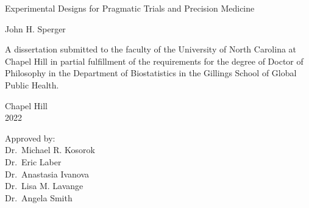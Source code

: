 \documentclass[12pt,,letterpaper,twoside]{report}
\begin{document}

\begin{titlepage}
\begin{center}


\vspace{2in}
\begin{singlespace}
Experimental Designs for Pragmatic Trials and Precision Medicine
\end{singlespace}


\vspace{61pt} %
John H. Sperger
\end{center}

\vspace{50pt}
\begin{singlespace}
\begin{center}
\noindent 
A dissertation submitted to the faculty of the University of North Carolina at Chapel Hill in partial fulfillment of the requirements for the degree of Doctor
of Philosophy in the Department of Biostatistics in the Gillings School
of Global Public Health.
\end{center}
\end{singlespace}


\vspace{50pt}
\begin{center}
\begin{singlespace} 
Chapel Hill\\
2022
\end{singlespace}
\end{center}

 

\vfill
\begin{flushright}
\begin{minipage}[t]{1.5in} 
Approved by:\\
 
 Dr.~Michael R. Kosorok \\  Dr.~Eric Laber \\ 
 Dr.~Anastasia Ivanova \\  Dr.~Lisa M. Lavange \\  Dr.~Angela Smith \\ 

\end{minipage}
\end{flushright}

\end{titlepage}
\end{document}
